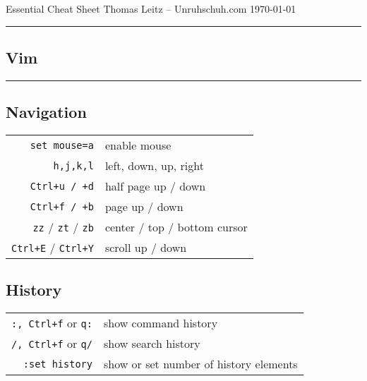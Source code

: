 

\author{Thomas Leitz (Unruhschuh.com)}
\date{\today}



\raggedcolumns

Essential Cheat Sheet\hfill
Thomas Leitz -- Unruhschuh.com\hfill
\today
\hrule
\vspace*{2pt}

\begin{multicols*}{3}
  

\centering

\section*{Vim}
\hrule\vspace*{2pt}
\subsection*{Navigation}
\begin{tabular}{@{}rl@{}}
\verb|set mouse=a| & enable mouse \\
\verb|h,j,k,l|     & left, down, up, right \\
\verb|Ctrl+u / +d| & half page up / down \\
\verb|Ctrl+f / +b| & page up / down \\
\verb|zz| / \verb|zt| / \verb|zb| & center / top / bottom cursor \\
\verb|Ctrl+E| / \verb|Ctrl+Y| & scroll up / down
\end{tabular}

\subsection*{History}
\begin{tabular}{@{}rl@{}}
\verb|:, Ctrl+f| or \verb|q:| & show command history \\
\verb|/, Ctrl+f| or \verb|q/| & show search history \\
\verb|:set history| & show or set number of history elements
\end{tabular}


\end{multicols*}
